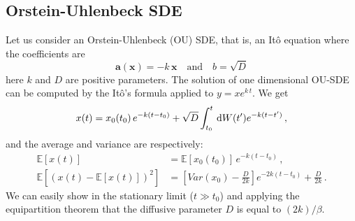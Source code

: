 \documentclass[10pt,a4paper]{book}
\theoremstyle{definition}
\begin{document}
\begin{appendices}
\subsection{Orstein-Uhlenbeck SDE}
Let us consider an Orstein-Uhlenbeck (OU) SDE, that is, an It\^o equation where the coefficients are
\[
 \mathbf{a}(\mathbf{x})=-k\,\mathbf{x}\quad\text{and}\quad b=\sqrt{D}
\]
here $k$ and $D$ are positive parameters. The solution of one dimensional OU-SDE can be computed by the It\^o's formula applied to $y=xe^{k\,t}$\cite{Gardiner2009}. We get 
\[
 x(t)=x_0(t_0)\,e^{-k(t-t_0)}+\sqrt{D}\int_{t_0}^t\,\mbox{d} W(t')e^{-k(t-t')}\,,
\]
and the average and variance are respectively:
\begin{align*}
 \mathbb{E}[x(t)] &= \mathbb{E}[x_0(t_0)]\,e^{-k(t-t_0)}\,, \\
 \mathbb{E}\left[ \left( x(t)-\mathbb{E}[x(t)] \right)^2 \right] &= \left[ Var(x_0)-\frac{D}{2k} \right]e^{-2k(t-t_0)}+\frac{D}{2k}\,.
\end{align*}
We can easily show in the stationary limit ($t\gg t_0$) and applying the equipartition theorem that the diffusive parameter $D$ is equal to $(2k)/\beta$.



\end{appendices}
\end{document}
